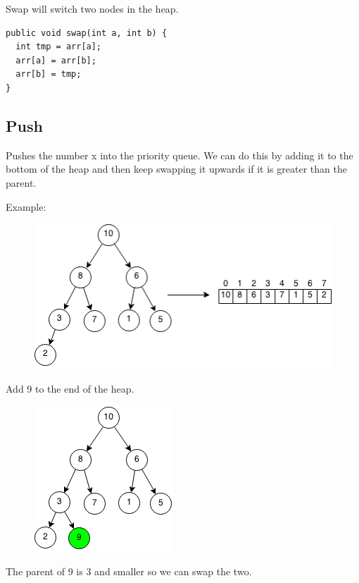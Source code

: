 \documentclass[11pt,oneside]{book}
\makeatletter
\def\maxwidth#1{\ifdim\Gin@nat@width>#1 #1\else\Gin@nat@width\fi}
\makeatother
\begin{document}
Swap will switch two nodes in the heap.

\begin{lstlisting}
public void swap(int a, int b) {
  int tmp = arr[a];
  arr[a] = arr[b];
  arr[b] = tmp;
}
\end{lstlisting}

\subsection{Push}

Pushes the number x into the priority queue. We can do this by adding it to the bottom of the heap and then keep swapping it upwards if it is greater than the parent.

Example:

\vspace{5px}\begin{figure}[H]\centering
        \includegraphics[width=0.66\maxwidth{\textwidth}]{maxheap.png}
        \end{figure}

Add 9 to the end of the heap.

\vspace{5px}\begin{figure}[H]\centering
        \includegraphics[width=0.66\maxwidth{\textwidth}]{maxheappush.png}
        \end{figure}

The parent of 9 is 3 and smaller so we can swap the two.
\end{document}

